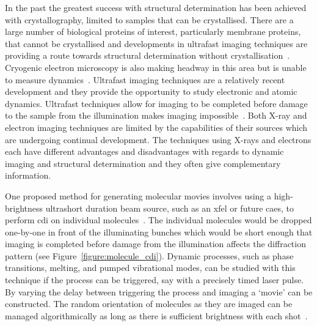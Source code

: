 In the past the greatest success with structural determination has been achieved with crystallography, limited to samples that can be crystallised.
There are a large number of biological proteins of interest, particularly membrane proteins, that cannot be crystallised and developments in ultrafast imaging techniques are providing a route towards structural determination without crystallisation~\cite{dauter_current_2006,levitt_nature_2009}.
Cryogenic electron microscopy is also making headway in this area but is unable to measure dynamics~\cite{henderson_model_1990,zhou_towards_2008}.
Ultrafast imaging techniques are a relatively recent development and they provide the opportunity to study electronic and atomic dynamics.
Ultrafast techniques allow for imaging to be completed before damage to the sample from the illumination makes imaging impossible~\cite{gaffney_imaging_2007,barty_ultrafast_2008,miao_beyond_2015}.
Both X-ray and electron imaging techniques are limited by the capabilities of their sources which are undergoing continual development.
The techniques using X-rays and electrons each have different advantages and disadvantages with regards to dynamic imaging and structural determination and they often give complementary information.

One proposed method for generating molecular movies involves using a high-brightness ultrashort duration beam source, such as an \gls{xfel} or future \gls{caes}, to perform \gls{cdi} on individual molecules~\cite{chapman_femtosecond_2006,dwyer_femtosecond_2006,gaffney_imaging_2007}.
The individual molecules would be dropped one-by-one in front of the illuminating bunches which would be short enough that imaging is completed before damage from the illumination affects the diffraction pattern (see Figure~\ref{figure:molecule_cdi}).
Dynamic processes, such as phase transitions, melting, and pumped vibrational modes, can be studied with this technique if the process can be triggered, say with a precisely timed laser pulse.
By varying the delay between triggering the process and imaging a `movie' can be constructed.
The random orientation of molecules as they are imaged can be managed algorithmically as long as there is sufficient brightness with each shot~\cite{yefanov_orientation_2013}.

